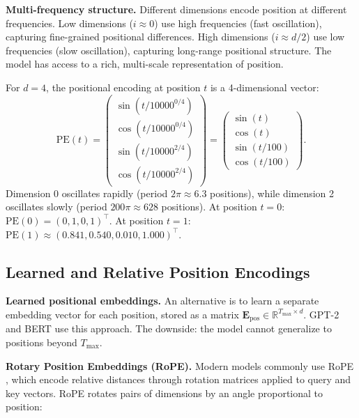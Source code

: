 \textbf{Multi-frequency structure.} Different dimensions encode position at different frequencies. Low dimensions ($i \approx 0$) use high frequencies (fast oscillation), capturing fine-grained positional differences. High dimensions ($i \approx d/2$) use low frequencies (slow oscillation), capturing long-range positional structure. The model has access to a rich, multi-scale representation of position.

\begin{example}
For $d = 4$, the positional encoding at position $t$ is a 4-dimensional vector:
\begin{equation}
\text{PE}(t) = \begin{pmatrix}
\sin(t / 10000^{0/4}) \\
\cos(t / 10000^{0/4}) \\
\sin(t / 10000^{2/4}) \\
\cos(t / 10000^{2/4})
\end{pmatrix} = \begin{pmatrix}
\sin(t) \\
\cos(t) \\
\sin(t/100) \\
\cos(t/100)
\end{pmatrix}.
\end{equation}
Dimension 0 oscillates rapidly (period $2\pi \approx 6.3$ positions), while dimension 2 oscillates slowly (period $200\pi \approx 628$ positions). At position $t=0$: $\text{PE}(0) = (0, 1, 0, 1)^\top$. At position $t=1$: $\text{PE}(1) \approx (0.841, 0.540, 0.010, 1.000)^\top$.
\end{example}

\subsection{Learned and Relative Position Encodings}

\textbf{Learned positional embeddings.} An alternative is to learn a separate embedding vector for each position, stored as a matrix $\mathbf{E}_{\text{pos}} \in \mathbb{R}^{T_{\max} \times d}$. GPT-2 and BERT use this approach. The downside: the model cannot generalize to positions beyond $T_{\max}$.

\textbf{Rotary Position Embeddings (RoPE).} Modern models commonly use RoPE \citep{su2024}, which encode relative distances through rotation matrices applied to query and key vectors. RoPE rotates pairs of dimensions by an angle proportional to position:

